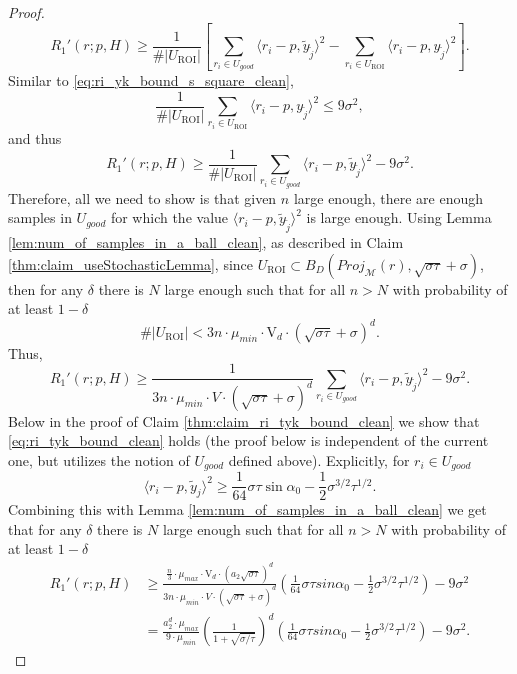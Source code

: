 \documentclass[12pt]{article}
\theoremstyle{remark}
\newcommand{\MM}{\mathcal{M}}
\newcommand{\lrangle}[1]{\langle #1 \rangle}
\begin{document}
\begin{appendices}
\begin{proof}
\[\]
\[
R_1'(r; p, H) \geq \frac{1}{\#|U_\textrm{ROI}|}\left[\sum\limits_{r_i\in U_{good}}  \langle r_i - p, \tilde{y}_{\tilde j} \rangle^2 - \sum\limits_{r_i\in U_\textrm{ROI}} \langle r_i - p, {y}_{\tilde j} \rangle^2\right]
.\]
Similar to \eqref{eq:ri_yk_bound_s_square_clean}, 
\[
\frac{1}{\#|U_\textrm{ROI}|}\sum\limits_{r_i\in U_\textrm{ROI}} \langle r_i - p, {y}_{\tilde j} \rangle^2 \leq 9 \sigma^2
,\]
and thus
\[
R_1'(r; p, H) \geq \frac{1}{\#|U_\textrm{ROI}|}\sum\limits_{r_i\in U_{good}}  \langle r_i - p, \tilde{y}_{\tilde j} \rangle^2
-9\sigma^2
.\]
Therefore, all we need to show is that given $n$ large enough, there are enough samples in $U_{good}$ for which the value $\lrangle{r_i - p, \tilde y_{\tilde j}}^2$ is large enough.
Using Lemma \ref{lem:num_of_samples_in_a_ball_clean}, as described in Claim \ref{thm:claim_useStochasticLemma}, since $U_\textrm{ROI}\subset B_D(Proj_{\MM}(r), \sqrt{\sigma \tau}+\sigma)$, then for any $\delta$ there is $N$ large enough such that for all $n>N$  with probability of at least $1 - \delta$ 
\[
\#|U_\textrm{ROI}| < 3n\cdot\mu_{min}\cdot \mathrm{V}_{d}\cdot (\sqrt{\sigma\tau}+\sigma)^d 
.\]
Thus,
\[
R_1'(r; p, H) \geq \frac{1}{3n\cdot\mu_{min}\cdot V\cdot ( \sqrt{\sigma\tau} +\sigma)^d }\sum\limits_{r_i\in U_{good}}  \langle r_i - p, \tilde{y}_{\tilde j} \rangle^2
-9\sigma^2
.\]
Below in the proof of Claim \ref{thm:claim_ri_tyk_bound_clean} we show that \eqref{eq:ri_tyk_bound_clean} holds (the proof below is independent of the current one, but utilizes the notion of $U_{good}$ defined above).
Explicitly, for $ r_i \in U_{good} $
\begin{equation*}
\lrangle{r_i - p, \tilde y_j}^2 \geq \frac{1}{64}\sigma \tau \sin\alpha_0 - \frac{1}{2}\sigma^{3/2}\tau^{1/2}
.\end{equation*}
Combining this with Lemma \ref{lem:num_of_samples_in_a_ball_clean} we get that for any $\delta$ there is $N$ large enough such that for all $n>N$  with probability of at least $1-\delta$
\begin{align*}
R_1'(r; p, H) 
&\geq 
\frac{\frac{n}{3}\cdot \mu_{max}\cdot \mathrm{V}_d \cdot(a_2\sqrt{\sigma\tau})^d}{3n\cdot\mu_{min}\cdot V\cdot ( \sqrt{\sigma\tau}+\sigma)^d}\left(\frac{1}{64}\sigma\tau sin\alpha_0 -  \frac{1}{2}\sigma^{3/2}\tau^{1/2} \right)
-9\sigma^2 \\
&=
\frac{ a_2^d\cdot\mu_{max}}{9\cdot\mu_{min}}\left(\frac{ 1}{1+\sqrt{\sigma/\tau}}\right)^d\left(\frac{1}{64}\sigma\tau sin\alpha_0 - \frac{1}{2}\sigma^{3/2}\tau^{1/2} \right)
-9 \sigma^2
.\end{align*}

\end{proof}
\end{appendices}
\end{document}
